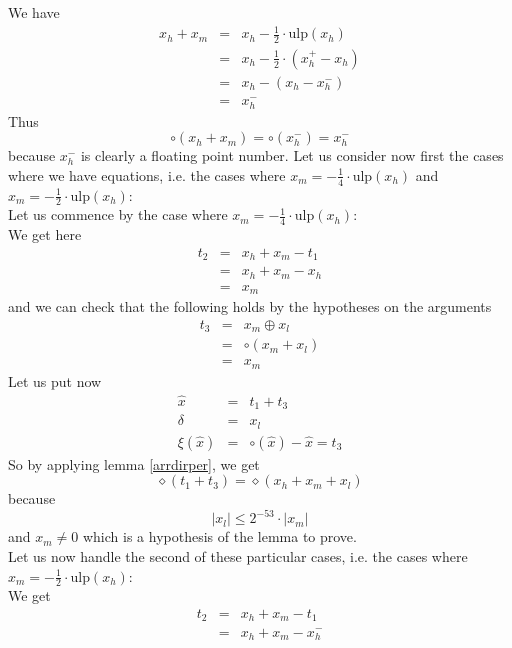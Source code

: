 \documentclass[a4paper,10pt,twoside]{article}
\newenvironment{proof}[1][Proof]{\begin{trivlist}
\item[\hskip \labelsep {\bfseries #1}]}{\end{trivlist}}
\newcommand{\hi}{\ensuremath{\mathit{h}}}
\newcommand{\mi}{\ensuremath{\mathit{m}}}
\newcommand{\lo}{\ensuremath{\mathit{l}}}
\newcommand{\mUlp}{\ensuremath{\mathrm{ulp}}}
\begin{document}
\begin{proof}
We have
\begin{eqnarray*}
x_\hi + x_\mi & = & x_\hi - \frac{1}{2} \cdot \mUlp\left( x_\hi \right) \\
& = & x_\hi - \frac{1}{2} \cdot \left( x_\hi^+ - x_\hi \right) \\
& = & x_\hi - \left( x_\hi - x_\hi^- \right) \\
& = & x_\hi^-
\end{eqnarray*}
Thus $$\circ \left( x_\hi + x_\mi \right) = \circ \left( x_\hi^- \right) = x_\hi^-$$
because $x_\hi^-$ is clearly a floating point number.
Let us consider now first the cases where we have equations, i.e. the cases where
$x_\mi = -\frac{1}{4} \cdot \mUlp\left( x_\hi \right)$ and
$x_\mi = - \frac{1}{2} \cdot \mUlp\left( x_\hi \right)$: \\
Let us commence by the case where $x_\mi = -\frac{1}{4} \cdot \mUlp\left( x_\hi \right)$: \\
We get here
\begin{eqnarray*}
t_2 & = & x_\hi + x_\mi - t_1 \\
& = & x_\hi + x_\mi - x_\hi \\
& = & x_\mi
\end{eqnarray*}
and we can check that the following holds by the hypotheses on the arguments
\begin{eqnarray*}
t_3 & = & x_\mi \oplus x_\lo \\
& = & \circ \left( x_\mi + x_\lo \right) \\
& = & x_\mi
\end{eqnarray*}
Let us put now
\begin{eqnarray*}
\hat{x} & = & t_1 + t_3 \\
\delta & = & x_\lo \\
\xi\left( \hat{x} \right) & = & \circ\left( \hat{x} \right) - \hat{x} = t_3
\end{eqnarray*}
So by applying lemma \ref{arrdirper}, we get
$$\diamond \left( t_1 + t_3 \right) = \diamond \left( x_\hi + x_\mi + x_\lo \right)$$
because
$$\left \vert x_\lo \right \vert \leq 2^{-53} \cdot \left \vert x_\mi \right \vert$$
and $x_\mi \not = 0$ which is a hypothesis of the lemma to prove. \\
Let us now handle the second of these particular cases, i.e. the cases where
$x_\mi = -\frac{1}{2} \cdot \mUlp\left( x_\hi \right)$: \\
We get
\begin{eqnarray*}
t_2 & = & x_\hi + x_\mi - t_1 \\
& = & x_\hi + x_\mi - x_\hi^- \\

\end{eqnarray*}
\end{proof}
\end{document}
